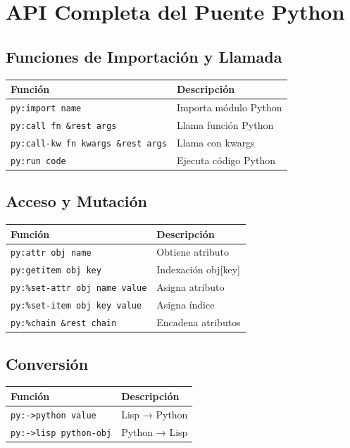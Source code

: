 \chapter{API Completa del Puente Python}
\label{app:python-api}

\section*{Funciones de Importación y Llamada}

\begin{center}
\begin{tabular}{ll}
\toprule
\textbf{Función} & \textbf{Descripción} \\
\midrule
\texttt{py:import name} & Importa módulo Python \\
\texttt{py:call fn \&rest args} & Llama función Python \\
\texttt{py:call-kw fn kwargs \&rest args} & Llama con kwargs \\
\texttt{py:run code} & Ejecuta código Python \\
\bottomrule
\end{tabular}
\end{center}

\section*{Acceso y Mutación}

\begin{center}
\begin{tabular}{ll}
\toprule
\textbf{Función} & \textbf{Descripción} \\
\midrule
\texttt{py:attr obj name} & Obtiene atributo \\
\texttt{py:getitem obj key} & Indexación obj[key] \\
\texttt{py:\%set-attr obj name value} & Asigna atributo \\
\texttt{py:\%set-item obj key value} & Asigna índice \\
\texttt{py:\%chain \&rest chain} & Encadena atributos \\
\bottomrule
\end{tabular}
\end{center}

\section*{Conversión}

\begin{center}
\begin{tabular}{ll}
\toprule
\textbf{Función} & \textbf{Descripción} \\
\midrule
\texttt{py:->python value} & Lisp → Python \\
\texttt{py:->lisp python-obj} & Python → Lisp \\
\bottomrule
\end{tabular}
\end{center}


